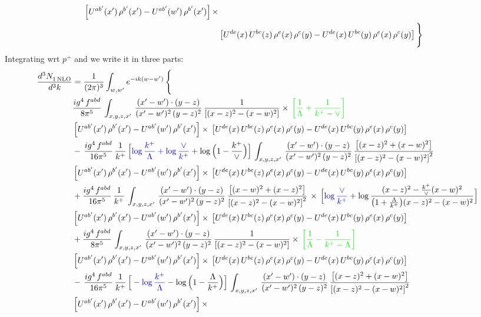 \documentclass[9pt]{article}
\numberwithin{equation}{section}
\begin{document}
\begin{align}
\left[U^{ab'}(x')\,\rho^{b'}(x')-U^{ab'}(w')\, \rho^{b'}(x')\right]\times\notag \\ & \left[U^{de}(x)\,U^{bc}(z)\, \rho^{e}(x)\,\rho^{c}(y)-U^{de}(x)\,U^{bc}(y)\,\rho^{e}(x)\,\rho^{c}(y)\right]\Bigg\}
\end{align}
Integrating wrt $p^{+}$ and we write it in three parts:
\begin{align}
   \frac{d^{3}N_{1\,\rm NLO}^{\rm}}{d^{3}k}  & = \frac{1}{(2\pi)^{3}}  \int_{w, w^\prime} e^{-ik(w-w^\prime)}\, \Bigg\{\notag \\ & \frac{ig^{4}\,f^{abd}}{8\pi^{5}}\,\int_{x,y,z,x'}\, \frac{(x'-w')\cdot (y-z)}{(x'-w')^{2}\,(y-z)^{2}}\, \frac{1}{\left[(x-z)^{2}-(x-w)^{2}\right]}\times\, {\color{green}\left[\frac{1}{\Lambda}+\frac{1}{k^{+}-\vee}\right]}\notag \\ & \left[U^{ab'}(x')\,\rho^{b'}(x')-U^{ab'}(w')\, \rho^{b'}(x')\right]\times\, \left[U^{de}(x)\,U^{bc}(z)\, \rho^{e}(x)\,\rho^{c}(y)-U^{de}(x)\,U^{bc}(y)\,\rho^{e}(x)\,\rho^{c}(y)\right]\notag \\ & -\,\frac{ig^{4}\,f^{abd}}{16\pi^{5}}\,\frac{1}{k^{+}}\,\Big[{\color{blue}\log\frac{k^{+}}{\Lambda}+\log\frac{\vee}{k^{+}}}+\log\Big(1-\frac{k^{+}}{\vee}\Big)\Big]\,\int_{x,y,z,x'}\, \frac{(x'-w')\cdot (y-z)}{(x'-w')^{2}\,(y-z)^{2}}\,\frac{\left[(x-z)^{2}+(x-w)^{2}\right]}{\left[(x-z)^{2}-(x-w)^{2}\right]^{2}}\notag \\ & \left[U^{ab'}(x')\,\rho^{b'}(x')-U^{ab'}(w')\, \rho^{b'}(x')\right]\times\, \left[U^{de}(x)\,U^{bc}(z)\, \rho^{e}(x)\,\rho^{c}(y)-U^{de}(x)\,U^{bc}(y)\,\rho^{e}(x)\,\rho^{c}(y)\right]\notag \\ &  +\frac{ig^{4}\,f^{abd}}{16\pi^{5}}\, \frac{1}{k^{+}}\,\int_{x,y,z,x'}\, \frac{(x'-w')\cdot (y-z)}{(x'-w')^{2}\,(y-z)^{2}}\, \frac{\left[(x-w)^{2}+(x-z)^{2}\right]}{\left[(x-z)^{2}-(x-w)^{2}\right]^{2}}\, \times\, \Big[{\color{blue}\log\frac{\vee}{k^{+}}}+\log\frac{(x-z)^{2}-\frac{k^{+}}{\vee}(x-w)^{2}}{\big(1+\frac{\Lambda}{k^{+}}\big)(x-z)^{2}-(x-w)^{2}}\Big]\notag \\ & \left[U^{ab'}(x')\,\rho^{b'}(x')-U^{ab'}(w')\, \rho^{b'}(x')\right]\times\, \left[U^{de}(x)\,U^{bc}(z)\, \rho^{e}(x)\,\rho^{c}(y)-U^{de}(x)\,U^{bc}(y)\,\rho^{e}(x)\,\rho^{c}(y)\right]\notag \\ &  + \frac{ig^{4}\,f^{abd}}{8\pi^{5}}\,\int_{x,y,z,x'}\, \frac{(x'-w')\cdot (y-z)}{(x'-w')^{2}\,(y-z)^{2}}\, \frac{1}{\left[(x-z)^{2}-(x-w)^{2}\right]}\times\, {\color{green}\left[\frac{1}{\Lambda}-\frac{1}{k^{+}-\Lambda}\right]}\notag \\ & \left[U^{ab'}(x')\,\rho^{b'}(x')-U^{ab'}(w')\, \rho^{b'}(x')\right]\times\, \left[U^{de}(x)\,U^{bc}(z)\, \rho^{e}(x)\,\rho^{c}(y)-U^{de}(x)\,U^{bc}(y)\,\rho^{e}(x)\,\rho^{c}(y)\right]\notag \\ & -\,\frac{ig^{4}\,f^{abd}}{16\pi^{5}}\,\frac{1}{k^{+}}\,\Big[-{\color{blue}\log\frac{k^{+}}{\Lambda}}-\log\Big(1-\frac{\Lambda}{k^{+}}\Big)\Big]\,\int_{x,y,z,x'}\, \frac{(x'-w')\cdot (y-z)}{(x'-w')^{2}\,(y-z)^{2}}\,\frac{\left[(x-z)^{2}+(x-w)^{2}\right]}{\left[(x-z)^{2}-(x-w)^{2}\right]^{2}}\notag \\ & \left[U^{ab'}(x')\,\rho^{b'}(x')-U^{ab'}(w')\, \rho^{b'}(x')\right]\times\, 
\end{align}
\end{document}
